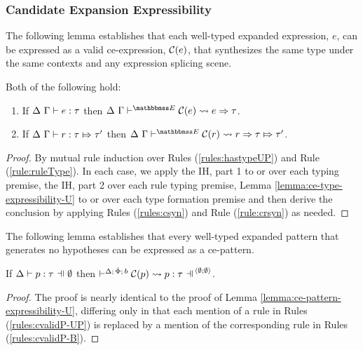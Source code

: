 \subsubsection{Candidate Expansion Expressibility}
The following lemma establishes that each well-typed expanded expression, $e$, can be expressed as a valid ce-expression, $\mathcal{C}(e)$, that synthesizes the same type under the same contexts and any expression splicing scene.
\begin{theorem}\label{lemma:ce-expressions-expressibility-B} Both of the following hold:
\begin{enumerate}
\item If $\Delta~\Gamma \vdash e : \tau$ then $\csyn{\Delta}{\Gamma}{\escenev}{\Cof{e}}{e}{\tau}$.
\item If $\Delta~\Gamma \vdash r : \tau \Mapsto \tau'$ then $\crsyn{\Delta}{\Gamma}{\escenev}{\Cof{r}}{r}{\tau}{\tau'}$.
\end{enumerate}
\end{theorem}
\begin{proof} By mutual rule induction over Rules (\ref{rules:hastypeUP}) and Rule (\ref{rule:ruleType}). In each case, we apply the IH, part 1 to or over each typing premise, the IH, part 2 over each rule typing premise, Lemma \ref{lemma:ce-type-expressibility-U} to or over each type formation premise and then derive the conclusion by applying Rules (\ref{rules:csyn}) and Rule (\ref{rule:crsyn}) as needed.
\end{proof}

The following lemma establishes that every well-typed expanded pattern that generates no hypotheses can be expressed as a ce-pattern.
\begin{lemma}\label{lemma:ce-pattern-expressibility-B} If $\patType{\emptyset}{p}{\tau}$ then $\cvalidP{\uGG{\emptyset}{\emptyset}}{\pscene{\Delta}{\uPhi}{b}}{\Cof{p}}{p}{\tau}$.\end{lemma}
\begin{proof} The proof is nearly identical to the proof of Lemma \ref{lemma:ce-pattern-expressibility-U}, differing only in that each mention of a rule in Rules (\ref{rules:cvalidP-UP}) is replaced by a mention of the corresponding rule in Rules (\ref{rules:cvalidP-B}).
\end{proof}

